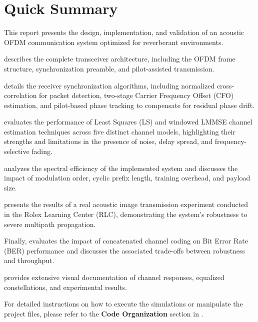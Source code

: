 \section*{Quick Summary}

This report presents the design, implementation, and validation of an acoustic OFDM communication system optimized for reverberant environments.

 describes the complete transceiver architecture, including the OFDM frame structure, synchronization preamble, and pilot-assisted transmission.

 details the receiver synchronization algorithms, including normalized cross-correlation for packet detection, two-stage Carrier Frequency Offset (CFO) estimation, and pilot-based phase tracking to compensate for residual phase drift.

 evaluates the performance of Least Squares (LS) and windowed LMMSE channel estimation techniques across five distinct channel models, highlighting their strengths and limitations in the presence of noise, delay spread, and frequency-selective fading.

 analyzes the spectral efficiency of the implemented system and discusses the impact of modulation order, cyclic prefix length, training overhead, and payload size.

 presents the results of a real acoustic image transmission experiment conducted in the Rolex Learning Center (RLC), demonstrating the system’s robustness to severe multipath propagation.

Finally,  evaluates the impact of concatenated channel coding on Bit Error Rate (BER) performance and discusses the associated trade-offs between robustness and throughput.

 provides extensive visual documentation of channel responses, equalized constellations, and experimental results.

\begin{Note}
    For detailed instructions on how to execute the simulations or manipulate the project files, please refer to the \textbf{Code Organization} section in .
\end{Note}